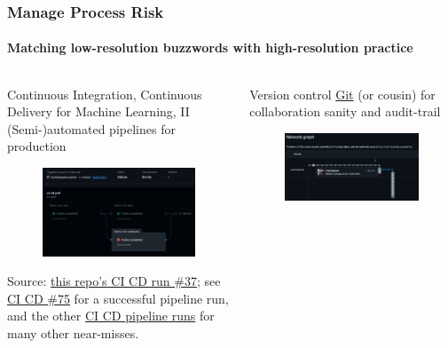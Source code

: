 \begin{frame}
    \frametitle{Manage Process Risk}
    \framesubtitle{Matching low-resolution buzzwords with high-resolution practice}
    \begin{columns}[T]
        \begin{column}{0.48\textwidth}
            \begin{block}{Continuous Integration, Continuous Delivery for Machine Learning, II}
                (Semi-)automated pipelines for production
                \begin{figure}[ht]
                    \includegraphics[height=0.25\textheight]{graphics/non-simple-ci-cd-pipeline}
                \end{figure}
                Source: \href{https://github.com/munichpavel/risk-ai-workshop/actions/runs/2038526473}{this repo's CI CD run \#37}; see \href{https://github.com/munichpavel/risk-ai-workshop/actions/runs/2084303272}{CI CD \#75} for a successful pipeline run, and the other \href{https://github.com/munichpavel/risk-ai-workshop/actions}{CI CD pipeline runs} for many other near-misses.
            \end{block}
        \end{column}
        \begin{column}{0.48\textwidth}
            \begin{block}{Version control}
                \href{https://git-scm.com/doc}{Git} (or cousin) for collaboration sanity and audit-trail
                \begin{figure}[ht]
                    \includegraphics[height=0.25\textheight]{graphics/git-network-commit-graph}

\end{figure}
\end{block}
\end{column}
\end{columns}
\end{frame}
